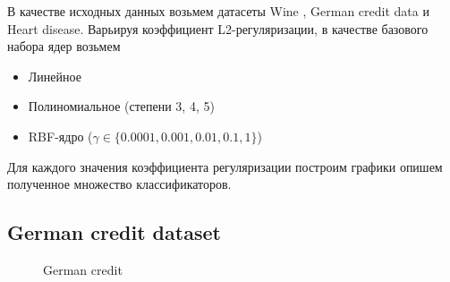 \documentclass[12pt,twoside]{article}
\theoremstyle{plain}
\theoremstyle{remark}
\theoremstyle{definition}
\begin{document}
В качестве исходных данных
возьмем датасеты Wine \cite{UCI:Wine}, German credit data\cite{UCI:German} и
Heart disease\cite{UCI:Heart}. Варьируя коэффициент L2-регуляризации, в качестве базового набора ядер возьмем

\begin{itemize}
    \item Линейное
    \item Полиномиальное (степени 3, 4, 5)
    \item RBF-ядро ($\gamma \in \{0.0001, 0.001, 0.01, 0.1, 1\}$)
\end{itemize}

Для каждого значения коэффициента регуляризации построим графики
опишем полученное множество классификаторов.



\newpage

\subsection{German credit dataset}

\begin{figure}[H]
      \caption{German credit}
\end{figure}
\end{document}
